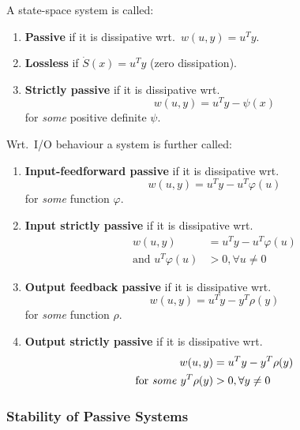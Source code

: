 \newpar{}

A state-space system is called:
\begin{enumerate}
    \item \textbf{Passive} if it is dissipative wrt.\ $w(u, y) = u^T y$.
    \item \textbf{Lossless} if $\dot{S}(x) = u^T y$ (zero dissipation).
    \item \textbf{Strictly passive} if it is dissipative wrt.\
          \begin{equation*}
              w(u, y) = u^T y - \psi(x)
          \end{equation*}
          for \textit{some} positive definite $\psi$.
\end{enumerate}
\newpar{}
Wrt.\ I/O behaviour a system is further called:
\begin{enumerate}
    \item[4.] \textbf{Input-feedforward passive} if it is dissipative wrt.\
          \begin{equation*}
              w(u, y) = u^T y - u^T \varphi(u)
          \end{equation*}
          for \textit{some} function $\varphi$.
    \item[5.] \textbf{Input strictly passive} if it is dissipative wrt.\
          \begin{align*}
              w(u, y)                    & = u^T y - u^T \varphi(u) \\
              \text{and } u^T \varphi(u) & > 0, \forall u \neq 0
          \end{align*}
    \item[6.] \textbf{Output feedback passive} if it is dissipative wrt.\
          \begin{equation*}
              w(u, y) = u^T y - y^T \rho(y)
          \end{equation*}
          for \textit{some} function $\rho$.
    \item[7.] \textbf{Output strictly passive} if it is dissipative wrt.\
          \begin{align*}
              w(u, y)                               & = u^T y - y^T \rho(y) \\
              \text{for \textit{some} } y^T \rho(y) & > 0, \forall y \neq 0
          \end{align*}
\end{enumerate}

\subsubsection{Stability of Passive Systems}

